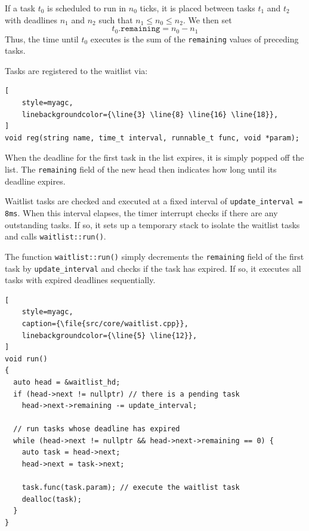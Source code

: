 \ifsubmission\newpage\fi
\begin{emptythm}
    If a task \(t_0\) is scheduled to run in \(n_0\) ticks, it is placed between tasks
    \(t_1\) and \(t_2\) with deadlines \(n_1\) and \(n_2\) such that \(n_1 \leq n_0
    \leq n_2\). We then set
    \[
        t_0.\texttt{remaining} = n_0 - n_1
    \]
    Thus, the time until \(t_0\) executes is the sum of the \texttt{remaining} values
    of preceding tasks.
\end{emptythm}

Tasks are registered to the waitlist via:

\begin{lstlisting}[
    style=myagc,
    linebackgroundcolor={\line{3} \line{8} \line{16} \line{18}},
]
void reg(string name, time_t interval, runnable_t func, void *param);
\end{lstlisting}

When the deadline for the first task in the list expires, it is simply popped off the
list. The \lstinline[style=myagc]|remaining| field of the new head then indicates how
long until its deadline expires.

Waitlist tasks are checked and executed at a fixed interval of
\lstinline[style=myagc]|update_interval = 8ms|. When this interval elapses, the timer
interrupt checks if there are any outstanding tasks. If so, it sets up a temporary
stack to isolate the waitlist tasks and calls \lstinline[style=myagc]|waitlist::run()|.

The function \lstinline[style=myagc]|waitlist::run()| simply decrements the
\lstinline[style=myagc]|remaining| field of the first task by
\lstinline[style=myagc]|update_interval| and checks if the task has expired. If so, it
executes all tasks with expired deadlines sequentially.

\begin{lstlisting}[
    style=myagc,
    caption={\file{src/core/waitlist.cpp}},
    linebackgroundcolor={\line{5} \line{12}},
]
void run()
{
  auto head = &waitlist_hd;
  if (head->next != nullptr) // there is a pending task
    head->next->remaining -= update_interval; 

  // run tasks whose deadline has expired
  while (head->next != nullptr && head->next->remaining == 0) { 
    auto task = head->next;
    head->next = task->next;

    task.func(task.param); // execute the waitlist task
    dealloc(task);
  }
}
\end{lstlisting}

